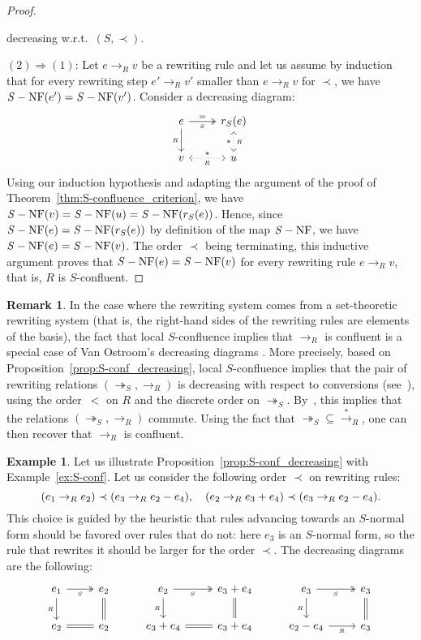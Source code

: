\documentclass[11pt]{article}
\theoremstyle{definition}
\newtheorem{remark}[theorem]{Remark}
\newtheorem{example}[theorem]{Example}
\newcommand\rewR{\to_R}
\newcommand\parS{\twoheadrightarrow_S}
\newcommand\transR{\overset{*}{\to}_R}
\DeclareMathOperator{\SNF}{{\it S}-NF}
\begin{document}
\begin{proof}
\begin{itemize}
    decreasing w.r.t.\ $(S,\prec)$.
  \end{itemize}
  $(2)\Rightarrow (1)$: Let $e\rewR v$ be a rewriting rule and let us
  assume by induction that for every rewriting step $e'\rewR v'$ smaller
  than $e\rewR v$ for $\prec$, we have $\SNF(e')=\SNF(v')$. Consider a
  decreasing diagram:
  \[\begin{tikzcd}
  e\ar[d, "_R"']\ar[r, twoheadrightarrow, "=", "_S"'] &
  r_S(e)\ar[d, leftrightarrow, dotted, "*"', "_R"]\\
  v\ar[r, leftrightarrow, dotted, "*", "_R"'] & u
  \end{tikzcd}\]
  Using our induction hypothesis and adapting the argument of the proof
  of Theorem~\ref{thm:S-confluence_criterion}, we have 
  $\SNF(v)=\SNF(u)=\SNF(r_S(e))$. Hence, since $\SNF(e)=\SNF(r_S(e))$ by
  definition of the map $\SNF$, we have $\SNF(e)=\SNF(v)$. The order
  $\prec$ being terminating, this inductive argument proves that
  $\SNF(e)=\SNF(v)$ for every rewriting rule $e\rewR v$, that is, $R$ is
  $S$-confluent.
\end{proof}
\smallskip

\begin{remark}
  In the case where the rewriting system comes from a set-theoretic
  rewriting system (that is, the right-hand sides of the rewriting rules
  are elements of the basis), the fact that local $S$-confluence implies
  that $\rewR$ is confluent is a special case of Van Ostroom's decreasing
  diagrams \cite{van2008confluence}. More precisely, based on
  Proposition~\ref{prop:S-conf_decreasing}, local $S$-confluence implies
  that the pair of rewriting relations $(\parS,\rewR)$ is decreasing with
  respect to conversions (see~\cite[Definition 3]{van2008confluence}),
  using the order~$<$ on $R$ and the discrete order on $\parS$.
  By~\cite[Theorem 3]{van2008confluence}, this implies that the relations
  $(\parS,\rewR)$ commute. Using the fact that $\parS \subseteq \transR$,
  one can then recover that $\rewR$ is confluent.
\end{remark}
\smallskip

\begin{example}\label{ex:end_to_example}
  Let us illustrate Proposition~\ref{prop:S-conf_decreasing} with
  Example~\ref{ex:S-conf}. Let us consider the following order $\prec$ on
  rewriting rules:
  \[(e_1\rewR e_2)\prec(e_3\rewR e_2-e_4),\quad(e_2\rewR e_3+e_4)\prec
  (e_3\rewR e_2-e_4).
  \smallskip\]
  This choice is guided by the heuristic that rules advancing towards an
  $S$-normal form should be favored over rules that do not: here $e_3$ is
  an $S$-normal form, so the rule that rewrites it should be larger for
  the order $\prec$. The decreasing diagrams are the following:
  \[\begin{tikzcd}
  e_1\ar[d, "_R"']\ar[r, twoheadrightarrow, "_S"'] &
  e_2\ar[d, equal] & e_2\ar[d, "_R"']
  \ar[r, twoheadrightarrow, "_S"'] & e_3+e_4\ar[d, equal] &
  e_3\ar[d, "_R"']\ar[r, twoheadrightarrow, "_S"'] & e_3\ar[d,equal]\\
  e_2\ar[r, equal] & e_2 & e_3+e_4\ar[r, equal] & e_3+e_4 & e_2-e_4
  \ar[r,  "_R"'] & e_3
  \end{tikzcd}\]
\end{example}
\smallskip
\end{document}
